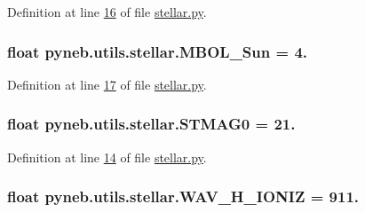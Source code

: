 Definition at line \hyperlink{stellar_8py_source_l00016}{16} of file \hyperlink{stellar_8py_source}{stellar.\+py}.

\hypertarget{namespacepyneb_1_1utils_1_1stellar_ab677115958b6555a42963ed87adc1afc}{}
\subsubsection[{M\+B\+O\+L\+\_\+\+Sun}]{\setlength{\rightskip}{0pt plus 5cm}float pyneb.\+utils.\+stellar.\+M\+B\+O\+L\+\_\+\+Sun = 4.}\label{namespacepyneb_1_1utils_1_1stellar_ab677115958b6555a42963ed87adc1afc}


Definition at line \hyperlink{stellar_8py_source_l00017}{17} of file \hyperlink{stellar_8py_source}{stellar.\+py}.

\hypertarget{namespacepyneb_1_1utils_1_1stellar_a53dc996c80c0bc5ee416b1fcbb8a6afc}{}
\subsubsection[{S\+T\+M\+A\+G0}]{\setlength{\rightskip}{0pt plus 5cm}float pyneb.\+utils.\+stellar.\+S\+T\+M\+A\+G0 = 21.}\label{namespacepyneb_1_1utils_1_1stellar_a53dc996c80c0bc5ee416b1fcbb8a6afc}


Definition at line \hyperlink{stellar_8py_source_l00014}{14} of file \hyperlink{stellar_8py_source}{stellar.\+py}.

\hypertarget{namespacepyneb_1_1utils_1_1stellar_afb8d2a4b14477b7097da285535eafc12}{}
\subsubsection[{W\+A\+V\+\_\+\+H\+\_\+\+I\+O\+N\+I\+Z}]{\setlength{\rightskip}{0pt plus 5cm}float pyneb.\+utils.\+stellar.\+W\+A\+V\+\_\+\+H\+\_\+\+I\+O\+N\+I\+Z = 911.}\label{namespacepyneb_1_1utils_1_1stellar_afb8d2a4b14477b7097da285535eafc12}


